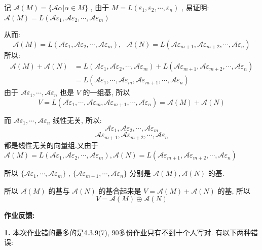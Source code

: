 \documentclass[11pt,a4paper,openany,oneside]{book}
\begin{document}
记 $ \mathcal{A}(M) = \{\mathcal{A}\alpha | \alpha \in M  \} $ , 由于 $ M = L(\varepsilon_1, \varepsilon_2, \cdots, \varepsilon_n) $ , 易证明: $ \mathcal{A}(M) = L(\mathcal{A}\varepsilon_1, \mathcal{A}\varepsilon_2, \cdots, \mathcal{A}\varepsilon_m) $ 

从而:
 $$  \mathcal{A}(M) = L(\mathcal{A}\varepsilon_1, \mathcal{A}\varepsilon_2, \cdots, \mathcal{A}\varepsilon_m), \ \ \ \mathcal{A}(N) = L(\mathcal{A}\varepsilon_{m+1}, \mathcal{A}\varepsilon_{m+2}, \cdots, \mathcal{A}\varepsilon_{n})  $$ 
所以:
\begin{align*}
\mathcal{A}(M) + \mathcal{A}(N) &=  L(\mathcal{A}\varepsilon_1, \mathcal{A}\varepsilon_2, \cdots, \mathcal{A}\varepsilon_m) +  L(\mathcal{A}\varepsilon_{m+1}, \mathcal{A}\varepsilon_{m+2}, \cdots, \mathcal{A}\varepsilon_{n})\\
&= L(\mathcal{A}\varepsilon_1,\cdots, \mathcal{A}\varepsilon_m, \mathcal{A}\varepsilon_{m+1},\cdots, \mathcal{A}\varepsilon_{n}) 
\end{align*}
由于 $ \mathcal{A}\varepsilon_1, \cdots, \mathcal{A}\varepsilon_n $ 也是 $ V $ 的一组基, 所以
 $$  V = L(\mathcal{A}\varepsilon_1,\cdots, \mathcal{A}\varepsilon_m, \mathcal{A}\varepsilon_{m+1},\cdots, \mathcal{A}\varepsilon_{n}) = \mathcal{A}(M) + \mathcal{A}(N)  $$ 

而 $ \mathcal{A}\varepsilon_1, \cdots, \mathcal{A}\varepsilon_n $ 线性无关, 所以:
 $$  \mathcal{A}\varepsilon_1, \mathcal{A}\varepsilon_2, \cdots, \mathcal{A}\varepsilon_m  $$ 
 $$  \mathcal{A}\varepsilon_{m+1}, \mathcal{A}\varepsilon_{m+2}, \cdots, \mathcal{A}\varepsilon_n  $$ 
都是线性无关的向量组.又由于 $  \mathcal{A}(M) = L(\mathcal{A}\varepsilon_1, \mathcal{A}\varepsilon_2, \cdots, \mathcal{A}\varepsilon_m),\mathcal{A}(N) = L(\mathcal{A}\varepsilon_{m+1}, \mathcal{A}\varepsilon_{m+2}, \cdots, \mathcal{A}\varepsilon_{n}) $ 

所以 $ \{\mathcal{A}\varepsilon_1, \cdots, \mathcal{A}\varepsilon_m \} $ ,  $ \{\mathcal{A}\varepsilon_{m+1}, \cdots, \mathcal{A}\varepsilon_n\} $ 分别是 $ \mathcal{A}(M), \mathcal{A}(N) $ 的基.

所以 $ \mathcal{A}(M) $ 的基与 $ \mathcal{A}(N) $ 的基合起来是 $ V = \mathcal{A}(M) + \mathcal{A}(N) $ 的基, 所以
 $$  V = \mathcal{A}(M) \oplus  \mathcal{A}(N)  $$ 

\newpage

\textbf{作业反馈:}

\textbf{1.} 本次作业错的最多的是4.3.9(7), 90多份作业只有不到十个人写对.  有以下两种错误:
\end{document}
